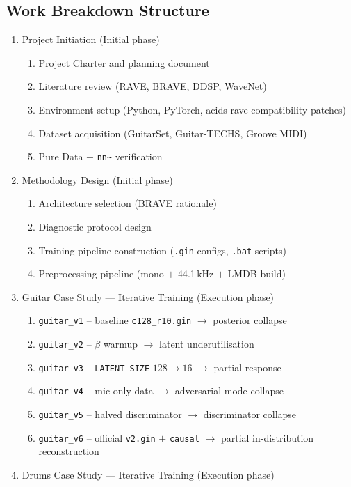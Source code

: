 \documentclass[a4paper,11pt,oneside,openany]{book}
\begin{document}
\begin{appendices}
\section{Work Breakdown Structure}

\begin{enumerate}
\item Project Initiation (Initial phase)
  \begin{enumerate}
  \item Project Charter and planning document
  \item Literature review (RAVE, BRAVE, DDSP, WaveNet)
  \item Environment setup (Python, PyTorch, acids-rave compatibility patches)
  \item Dataset acquisition (GuitarSet, Guitar-TECHS, Groove MIDI)
  \item Pure Data $+$ \texttt{nn\textasciitilde} verification
  \end{enumerate}
\item Methodology Design (Initial phase)
  \begin{enumerate}
  \item Architecture selection (BRAVE rationale)
  \item Diagnostic protocol design
  \item Training pipeline construction (\texttt{.gin} configs, \texttt{.bat} scripts)
  \item Preprocessing pipeline (mono $+$ 44.1\,kHz $+$ LMDB build)
  \end{enumerate}
\item Guitar Case Study --- Iterative Training (Execution phase)
  \begin{enumerate}
  \item \texttt{guitar\_v1} -- baseline \texttt{c128\_r10.gin} $\to$ posterior collapse
  \item \texttt{guitar\_v2} -- $\beta$ warmup $\to$ latent underutilisation
  \item \texttt{guitar\_v3} -- \texttt{LATENT\_SIZE} $128\to16$ $\to$ partial response
  \item \texttt{guitar\_v4} -- mic-only data $\to$ adversarial mode collapse
  \item \texttt{guitar\_v5} -- halved discriminator $\to$ discriminator collapse
  \item \texttt{guitar\_v6} -- official \texttt{v2.gin} $+$ \texttt{causal} $\to$ partial in-distribution reconstruction
  \end{enumerate}
\item Drums Case Study --- Iterative Training (Execution phase)

\end{enumerate}
\end{appendices}
\end{document}
